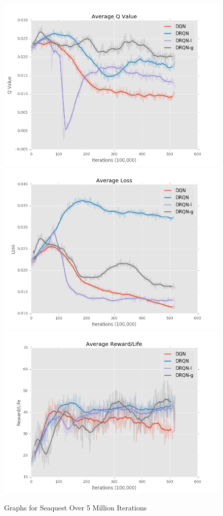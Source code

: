 \documentclass{article}
\begin{document}
\begin{figure}[h]
    \centering
    \begin{minipage}{1.0\textwidth}
        \centering
        \includegraphics[scale=0.2]{Seaquest1}
        \centering
        \includegraphics[scale=0.2]{Seaquest2}
        \centering
        \includegraphics[scale=0.2]{Seaquest3}
    \end{minipage}
    \caption{Graphs for Seaquest Over 5 Million Iterations}
\end{figure}
\end{document}
